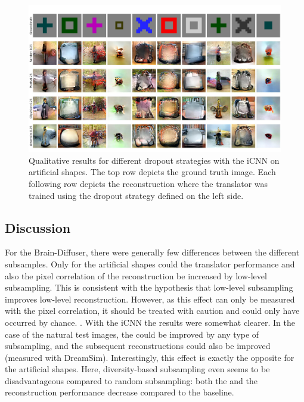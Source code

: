 \begin{figure}[ht]
  \centering
  \includegraphics[width=1\textwidth]{plots/dropout_qual_eval_icnn_art.JPEG}
  \caption[Experiment 1: Reconstructed images for iCNN on artificial shapes]{Qualitative results for different dropout strategies with the iCNN on artificial shapes. The top row depicts the ground truth image. Each following row depicts the reconstruction where the translator was trained using the dropout strategy defined on the left side.}\label{fig:dropout_qual_eval_icnn_art}
\end{figure}

\subsection{Discussion}
  
 For the Brain-Diffuser, there were generally few differences between the different subsamples. Only for the artificial shapes could the translator performance and also the pixel correlation of the reconstruction be increased by low-level subsampling. This is consistent with the hypothesis that low-level subsampling improves low-level reconstruction. However, as this effect can only be measured with the pixel correlation, it should be treated with caution and could only have occurred by chance. . With the iCNN the results were somewhat clearer. In the case of the natural test images, the  could be improved by any type of subsampling, and the subsequent reconstructions could also be improved (measured with DreamSim). Interestingly, this effect is exactly the opposite for the artificial shapes. Here, diversity-based subsampling even seems to be disadvantageous compared to random subsampling: both the  and the reconstruction performance decrease compared to the baseline. 

